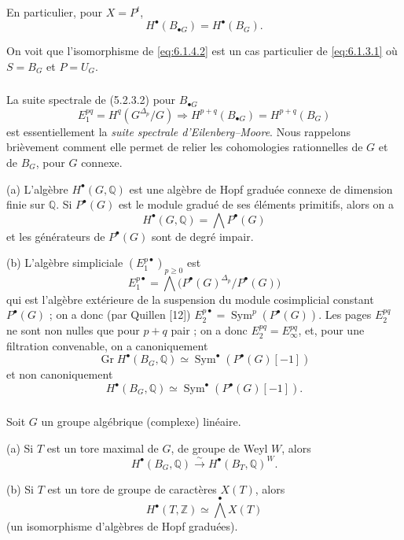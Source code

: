 \documentclass[11pt]{amsart}
\theoremstyle{plain}
\theoremstyle{definition}
\DeclareMathOperator{\Gr}{Gr}
\DeclareMathOperator{\Sym}{Sym}
\newcommand{\QQ}{\mathbb{Q}}
\newcommand{\ZZ}{\mathbb{Z}}
\newcommand{\Pt}{P^t}
\begin{document}
En particulier, pour $X = \Pt$,
\begin{equation}\label{eq:6.1.4.2}
H^\bullet(B_{\bullet G}) = H^\bullet(B_G).
\end{equation}

On voit que l'isomorphisme de \eqref{eq:6.1.4.2} est un cas particulier de \eqref{eq:6.1.3.1} o\`u $S = B_G$ et $P = U_G$.

\subsubsection{}
La suite spectrale de (5.2.3.2) pour $B_{\bullet G}$
\[
E_1^{pq} = H^q(G^{\Delta_p}/G) \Rightarrow H^{p+q}(B_{\bullet G}) = H^{p+q}(B_G)
\]
est essentiellement la \emph{suite spectrale d'Eilenberg--Moore}. Nous rappelons bri\`evement comment elle permet de relier les cohomologies rationnelles de $G$ et de $B_G$, pour $G$ connexe.

(a) L'alg\`ebre $H^\bullet(G, \QQ)$ est une alg\`ebre de Hopf gradu\'ee connexe de dimension finie sur $\QQ$. Si $P^\bullet(G)$ est le module gradu\'e de ses \'el\'ements primitifs, alors on a
\[
H^\bullet(G, \QQ) = \bigwedge P^\bullet(G)
\]
et les g\'en\'erateurs de $P^\bullet(G)$ sont de degr\'e impair.

(b) L'alg\`ebre simpliciale $(E_1^{p\bullet})_{p \geq 0}$ est
\[
E_1^{p\bullet} = \bigwedge\big(P^\bullet(G)^{\Delta_p}/P^\bullet(G)\big)
\]
qui est l'alg\`ebre ext\'erieure de la suspension du module cosimplicial constant $P^\bullet(G)$ ; on a donc (par Quillen [12]) $E_2^{p\bullet} = \Sym^p(P^\bullet(G))$. Les pages $E_2^{pq}$ ne sont non nulles que pour $p+q$ pair ; on a donc $E_2^{pq} = E_\infty^{pq}$, et, pour une filtration convenable, on a canoniquement
\[
\Gr H^\bullet(B_G, \QQ) \simeq \Sym^\bullet(P^\bullet(G)[-1])
\]
et non canoniquement
\[
H^\bullet(B_G, \QQ) \simeq \Sym^\bullet(P^\bullet(G)[-1]).
\]

\subsubsection{}
Soit $G$ un groupe alg\'ebrique (complexe) lin\'eaire.

(a) Si $T$ est un tore maximal de $G$, de groupe de Weyl $W$, alors
\begin{equation}\label{eq:6.1.6.1}
H^\bullet(B_G, \QQ) \xrightarrow{\sim} H^\bullet(B_T, \QQ)^W.
\end{equation}

(b) Si $T$ est un tore de groupe de caract\`eres $X(T)$, alors
\begin{equation}\label{eq:6.1.6.2}
H^\bullet(T, \ZZ) \simeq \bigwedge^\bullet X(T)
\end{equation}
(un isomorphisme d'alg\`ebres de Hopf gradu\'ees).
\end{document}
